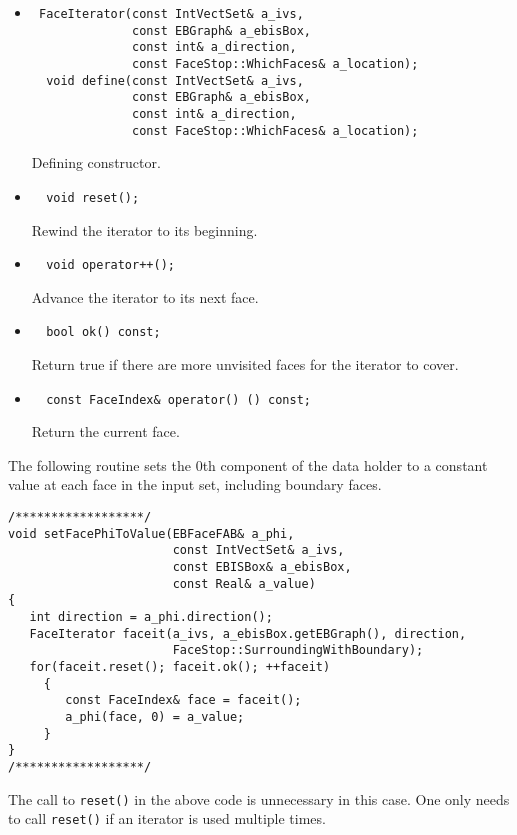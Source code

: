 \begin{itemize}
\item \begin{verbatim}
 FaceIterator(const IntVectSet& a_ivs,
              const EBGraph& a_ebisBox,
              const int& a_direction,
              const FaceStop::WhichFaces& a_location);
  void define(const IntVectSet& a_ivs,
              const EBGraph& a_ebisBox,
              const int& a_direction,
              const FaceStop::WhichFaces& a_location);
\end{verbatim}
  Defining constructor.  

\item \begin{verbatim}
  void reset();
\end{verbatim}
  Rewind the iterator to its beginning.

\item \begin{verbatim}
  void operator++();
\end{verbatim}
 Advance the iterator to its next face.

\item \begin{verbatim}
  bool ok() const;
\end{verbatim}
Return true if there are more unvisited faces for
the iterator to cover.

\item \begin{verbatim}
  const FaceIndex& operator() () const;
\end{verbatim}
Return the current face.
\end{itemize}
The following routine sets the 0th component of the
data holder to a constant value at each face in
the input set, including boundary faces.
\begin{small}
\begin{verbatim}
/******************/
void setFacePhiToValue(EBFaceFAB& a_phi,
                       const IntVectSet& a_ivs,
                       const EBISBox& a_ebisBox,
                       const Real& a_value)
{
   int direction = a_phi.direction();
   FaceIterator faceit(a_ivs, a_ebisBox.getEBGraph(), direction,
                       FaceStop::SurroundingWithBoundary);
   for(faceit.reset(); faceit.ok(); ++faceit)
     {
        const FaceIndex& face = faceit();
        a_phi(face, 0) = a_value;
     }
}
/******************/
\end{verbatim}
\end{small}
The call to {\tt reset()} in the above code
is unnecessary in this case.  One only needs
to call {\tt reset()} if an iterator is 
used multiple times.

